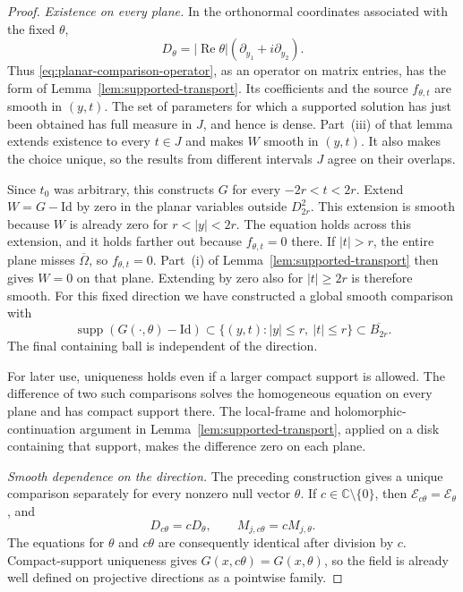 \documentclass[11pt]{article}
\newcommand{\C}{\mathbb C}
\newcommand{\Id}{\mathrm{Id}}
\DeclareMathOperator{\supp}{supp}
\newcommand{\Ecal}{\mathcal E}
\theoremstyle{remark}
\numberwithin{equation}{section}
\begin{document}
\begin{proof}
\emph{Existence on every plane.}
In the orthonormal coordinates associated with the fixed $\theta$,
\[
 D_\theta=|\operatorname{Re}\theta|
                 (\partial_{y_1}+i\partial_{y_2}).
\]
Thus \eqref{eq:planar-comparison-operator}, as an operator on matrix
entries, has the form of Lemma~\ref{lem:supported-transport}.
Its coefficients and the source $f_{\theta,t}$ are smooth in $(y,t)$.
The set of parameters for which a supported solution has just been
obtained has full measure in $J$, and hence is dense. Part~\textup{(iii)}
of that lemma extends existence to every $t\in J$ and makes $W$
smooth in $(y,t)$. It also makes the choice unique, so the results
from different intervals $J$ agree on their overlaps.

Since $t_0$ was arbitrary, this constructs $G$ for every
$-2r<t<2r$. Extend $W=G-\Id$ by zero in the planar variables
outside $D_{2r}^2$. This extension is smooth because $W$ is already
zero for $r<|y|<2r$. The equation holds across this extension, and
it holds farther out because $f_{\theta,t}=0$ there. If $|t|>r$,
the entire plane misses $\overline\Omega$, so $f_{\theta,t}=0$.
Part~\textup{(i)} of Lemma~\ref{lem:supported-transport} then gives
$W=0$ on that plane. Extending by zero also for $|t|\geq2r$ is
therefore smooth. For this fixed direction we have constructed a
global smooth comparison with
\begin{equation}\label{eq:comparison-uniform-support}
 \supp(G(\cdot,\theta)-\Id)
 \subset\{(y,t):|y|\leq r,\ |t|\leq r\}
 \subset\overline{B_{2r}}.
\end{equation}
The final containing ball is independent of the direction.

For later use, uniqueness holds even if a larger compact support is
allowed. The difference of two such comparisons solves the
homogeneous equation on every plane and has compact support there.
The local-frame and holomorphic-continuation argument in
Lemma~\ref{lem:supported-transport}, applied on a disk containing
that support, makes the difference zero on each plane.

\emph{Smooth dependence on the direction.}
The preceding construction gives a unique comparison separately for
every nonzero null vector $\theta$. If $c\in\C\setminus\{0\}$,
then $\Ecal_{c\theta}=\Ecal_\theta$, and
\[
 D_{c\theta}=cD_\theta,
 \qquad M_{j,c\theta}=cM_{j,\theta}.
\]
The equations for $\theta$ and $c\theta$ are consequently identical
after division by $c$. Compact-support uniqueness gives
$G(x,c\theta)=G(x,\theta)$, so the field is already well defined
on projective directions as a pointwise family.


\end{proof}
\end{document}
